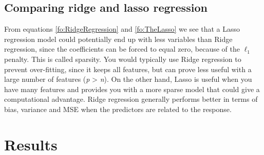 \subsection{Comparing ridge and lasso regression}

From equations \ref{fo:RidgeRegression} and \ref{fo:TheLasso} we see that a Lasso regression model could potentially end up with less variables than Ridge regression, since the coefficients can be forced to equal zero, because of the $\ell_1$ penalty. This is called sparsity. You would typically use Ridge regression to prevent over-fitting, since it keeps all features, but can prove less useful with a large number of features (\textit{p} > \textit{n}). On the other hand, Lasso is useful when you have many features and provides you with a more sparse model that could give a computational advantage. Ridge regression generally performs better in terms of bias, variance and MSE when the predictors are related to the response. %

\section{Results}
